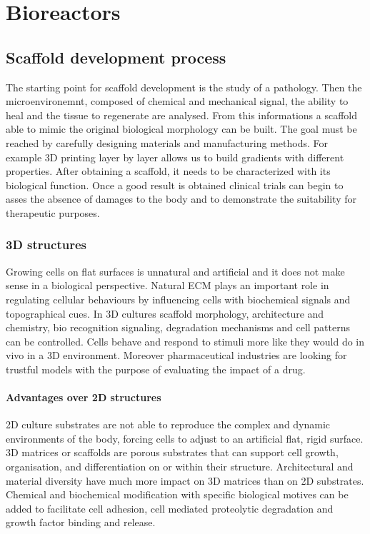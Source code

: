 \graphicspath{{chapters/10/images/}}
\chapter{Bioreactors}

\section{Scaffold development process}
The starting point for scaffold development is the study of a pathology.
Then the microenvironemnt, composed of chemical and mechanical signal, the ability to heal and the tissue to regenerate are analysed.
From this informations a scaffold able to mimic the original biological morphology can be built.
The goal must be reached by carefully designing materials and manufacturing methods.
For example 3D printing layer by layer allows us to build gradients with different properties.
After obtaining a scaffold, it needs to be characterized with its biological function.
Once a good result is obtained clinical trials can begin to asses the absence of damages to the body and to demonstrate the suitability for therapeutic purposes.

	\subsection{3D structures}
	Growing cells on flat surfaces is unnatural and artificial and it does not make sense in a biological perspective.
	Natural ECM plays an important role in regulating cellular behaviours by influencing cells with biochemical signals and topographical cues.
	In 3D cultures scaffold morphology, architecture and chemistry, bio recognition signaling, degradation mechanisms and cell patterns can be controlled.
	Cells behave and respond to stimuli more like they would do in vivo in a 3D environment.
	Moreover pharmaceutical industries are looking for trustful models with the purpose of evaluating the impact of a drug.

		\subsubsection{Advantages over 2D structures}
		2D culture substrates are not able to reproduce the complex and dynamic environments of the body, forcing cells to adjust to an artificial flat, rigid surface.
		3D matrices or scaffolds are porous substrates that can support cell growth, organisation, and differentiation on or within their structure.
		Architectural and material diversity have much more impact on 3D matrices than on 2D substrates.
		Chemical and biochemical modification with specific biological motives can be added to facilitate cell adhesion, cell mediated proteolytic degradation and growth factor binding and release.

